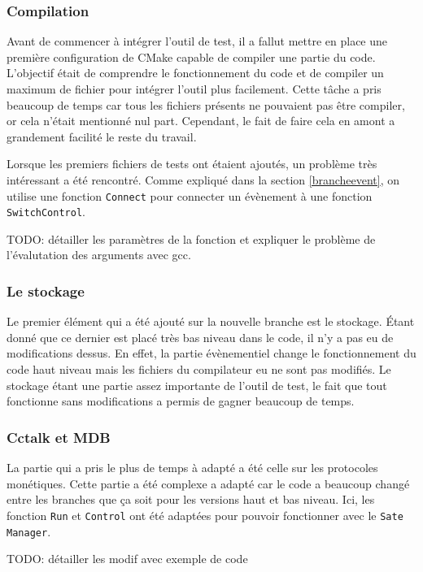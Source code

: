 \documentclass[a4paper]{article}
\begin{document}
\subsubsection*{Compilation}

Avant de commencer à intégrer l'outil de test, il a fallut mettre en place une
première configuration de CMake capable de compiler une partie du code.
L'objectif était de comprendre le fonctionnement du code et de compiler un
maximum de fichier pour intégrer l'outil plus facilement. Cette tâche a pris
beaucoup de temps car tous les fichiers présents ne pouvaient pas être compiler,
or cela n'était mentionné nul part. Cependant, le fait de faire cela en amont a
grandement facilité le reste du travail.

Lorsque les premiers fichiers de tests ont étaient ajoutés, un problème très
intéressant a été rencontré. Comme expliqué dans la section \ref{brancheevent},
on utilise une fonction \verb|Connect| pour connecter un évènement à une
fonction \verb|SwitchControl|.

TODO: détailler les paramètres de la fonction et expliquer le problème de
l'évalutation des arguments avec gcc.

\subsubsection*{Le stockage}

Le premier élément qui a été ajouté sur la nouvelle branche est le stockage.
Étant donné que ce dernier est placé très bas niveau dans le code, il n'y a pas
eu de modifications dessus. En effet, la partie évènementiel change le
fonctionnement du code haut niveau mais les fichiers du compilateur eu ne sont
pas modifiés. Le stockage étant une partie assez importante de l'outil de test,
le fait que tout fonctionne sans modifications a permis de gagner beaucoup de
temps.

\subsubsection*{Cctalk et MDB}

La partie qui a pris le plus de temps à adapté a été celle sur les protocoles
monétiques. Cette partie a été complexe a adapté car le code a beaucoup changé
entre les branches que ça soit pour les versions haut et bas niveau. Ici, les
fonction \verb|Run| et \verb|Control| ont été adaptées pour pouvoir fonctionner
avec le \verb|Sate Manager|.

TODO: détailler les modif avec exemple de code
\end{document}
